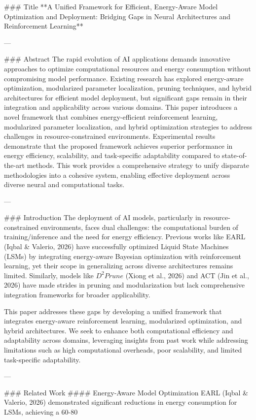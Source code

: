 ### Title  
**A Unified Framework for Efficient, Energy-Aware Model Optimization and Deployment: Bridging Gaps in Neural Architectures and Reinforcement Learning**

---

### Abstract  
The rapid evolution of AI applications demands innovative approaches to optimize computational resources and energy consumption without compromising model performance. Existing research has explored energy-aware optimization, modularized parameter localization, pruning techniques, and hybrid architectures for efficient model deployment, but significant gaps remain in their integration and applicability across various domains. This paper introduces a novel framework that combines energy-efficient reinforcement learning, modularized parameter localization, and hybrid optimization strategies to address challenges in resource-constrained environments. Experimental results demonstrate that the proposed framework achieves superior performance in energy efficiency, scalability, and task-specific adaptability compared to state-of-the-art methods. This work provides a comprehensive strategy to unify disparate methodologies into a cohesive system, enabling effective deployment across diverse neural and computational tasks.

---

### Introduction  
The deployment of AI models, particularly in resource-constrained environments, faces dual challenges: the computational burden of training/inference and the need for energy efficiency. Previous works like EARL (Iqbal & Valerio, 2026) have successfully optimized Liquid State Machines (LSMs) by integrating energy-aware Bayesian optimization with reinforcement learning, yet their scope in generalizing across diverse architectures remains limited. Similarly, models like $D^2Prune$ (Xiong et al., 2026) and ACT (Jin et al., 2026) have made strides in pruning and modularization but lack comprehensive integration frameworks for broader applicability.

This paper addresses these gaps by developing a unified framework that integrates energy-aware reinforcement learning, modularized optimization, and hybrid architectures. We seek to enhance both computational efficiency and adaptability across domains, leveraging insights from past work while addressing limitations such as high computational overheads, poor scalability, and limited task-specific adaptability.

---

### Related Work  
#### Energy-Aware Model Optimization  
EARL (Iqbal & Valerio, 2026) demonstrated significant reductions in energy consumption for LSMs, achieving a 60-80%

